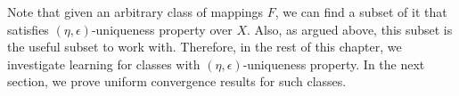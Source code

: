 \documentclass[letterpaper,12pt,titlepage,oneside,final]{book}
\newtheorem{definition}{Definition}
\newtheorem{remark}{Remark}
\begin{document}
Note that given an arbitrary class of mappings $F$, we can find a subset of it that satisfies $(\eta, \epsilon)$-uniqueness property over $X$. Also, as argued above, this subset is the useful subset to work with. Therefore, in the rest of this chapter, we investigate learning for classes with $(\eta, \epsilon)$-uniqueness property. In the next section, we prove uniform convergence results for such classes.






%
%
%
%
%
%
%
%
%
%
%
%
%
\end{document}
